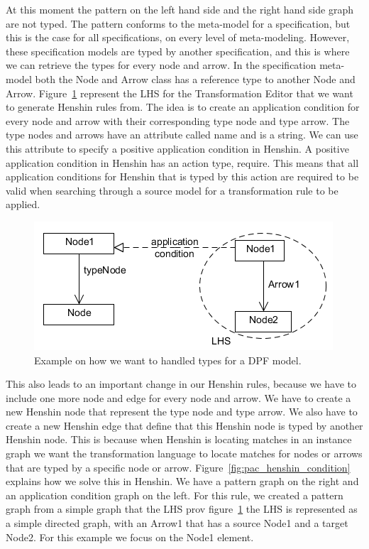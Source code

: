 At this moment the pattern on the left hand side and the right hand side graph
are not typed. The pattern conforms to the meta-model for a specification, but
this is the case for all specifications, on every level of meta-modeling. However,
these specification models are typed by another specification, and this is
where we can retrieve the types for every node and arrow. In the specification
meta-model both the Node and Arrow class has a reference type to another Node
and Arrow. Figure~\ref{fig:pac_henshin} represent the LHS for the
Transformation Editor that we want to generate Henshin rules from. The idea is
to create an application condition for every node and arrow with their
corresponding type node and type arrow. The type nodes and arrows have an
attribute called name and is a string. We can use this attribute to specify a
positive application condition in Henshin. A positive application condition in
Henshin has an action type, require. This means that all application conditions
for Henshin that is typed by this action are required to be valid when searching
through a source model for a transformation rule to be applied. 

\begin{figure}[H] 
	\centering
	\includegraphics[scale=0.7]{./Figures/PAC_Henshin.png}
	\caption[How we want to handled types for a DPF model]
	{Example on how we want to handled types for a DPF model.}
	\label{fig:pac_henshin}
\end{figure}

This also leads to an important change in our Henshin rules, because we have to
include one more node and edge for every node and arrow. We have to create a new
Henshin node that represent the type node and type arrow. We also have to create
a new Henshin edge that define that this Henshin node is typed by another
Henshin node. This is because when Henshin is locating matches in an instance
graph we want the transformation language to locate matches for nodes or
arrows that are typed by a specific node or arrow. 
Figure~\ref{fig:pac_henshin_condition} explains how we solve this in Henshin.
We have a pattern graph on the right and an application condition graph on the
left. For this rule, we created a pattern graph from a simple graph that the LHS
prov figure~\ref{fig:pac_henshin} the LHS is represented as a simple
directed graph, with an Arrow1 that has a source Node1 and a target Node2. For
this example we focus on the Node1 element.

